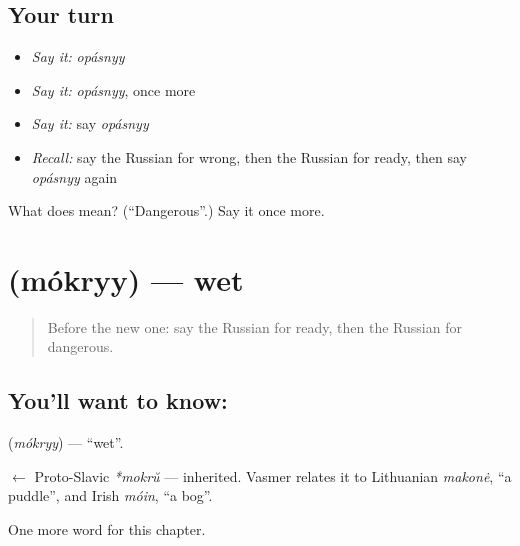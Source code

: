 \subsection*{Your turn}
\begin{itemize}
\raggedright
  \item \emph{Say it:} \emph{opásnyy}
  \item \emph{Say it:} \emph{opásnyy}, once more
  \item \emph{Say it:} say \emph{opásnyy}
  \item \emph{Recall:} say the Russian for wrong, then the Russian for ready, then say \emph{opásnyy} again
\end{itemize}

\begin{tcolorbox}[breakable,colback=teal!4,colframe=teal!35!black,title={Before you move on}]
What does  mean? (\textquotedblleft{}Dangerous\textquotedblright{}.) Say it once more.
\end{tcolorbox}
\section[\texorpdfstring{\ru{мокрый} (mókryy)}{мокрый (mókryy)}]{ (mókryy) — wet}

\label{lesson:RU-C128-wet}



\begin{quote}
Before the new one: say the Russian for ready, then the Russian for dangerous.
\end{quote}

\subsection*{You'll want to know: }
\textbf{} (\emph{mókryy}) — \textquotedblleft{}wet\textquotedblright{}.

\begin{cousinweb}
\textbf{} $\leftarrow$ Proto-Slavic \emph{*mokrŭ} — inherited. Vasmer relates it to Lithuanian \emph{makonė}, \textquotedblleft{}a puddle\textquotedblright{}, and Irish \emph{móin}, \textquotedblleft{}a bog\textquotedblright{}.
\end{cousinweb}

\begin{grammarlens}[title={What you've built}]
One more word for this chapter.
\end{grammarlens}

